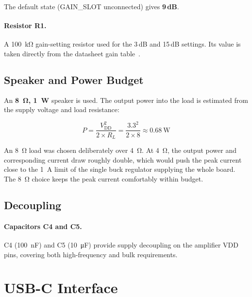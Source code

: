 The default state (GAIN\_SLOT unconnected) gives \textbf{9\,dB}.

\paragraph{Resistor R1.}
A \SI{100}{\kilo\ohm} gain-setting resistor used for the 3\,dB and 15\,dB settings.
Its value is taken directly from the datasheet gain table~\cite{ref6}.

\subsection{Speaker and Power Budget}
\label{subsec:speaker}

An \textbf{\SI{8}{\ohm}, \SI{1}{\watt}} speaker is used. The output power into the
load is estimated from the supply voltage and load resistance:

\begin{equation}
  P = \frac{V_\mathrm{DD}^{2}}{2 \times R_L}
    = \frac{3.3^{2}}{2 \times 8}
    \approx \SI{0.68}{\watt}
  \label{eq:speaker-power}
\end{equation}

An \SI{8}{\ohm} load was chosen deliberately over \SI{4}{\ohm}. At \SI{4}{\ohm}, the
output power and corresponding current draw roughly double, which would push the peak
current close to the \SI{1}{\ampere} limit of the single buck regulator supplying the
whole board. The \SI{8}{\ohm} choice keeps the peak current comfortably within budget.

\subsection{Decoupling}
\label{subsec:audio-decoupling}

\paragraph{Capacitors C4 and C5.}
C4 (\SI{100}{\nano\farad}) and C5 (\SI{10}{\micro\farad}) provide supply decoupling on
the amplifier VDD pins, covering both high-frequency and bulk requirements.

\section{USB-C Interface}
\label{sec:usb}


